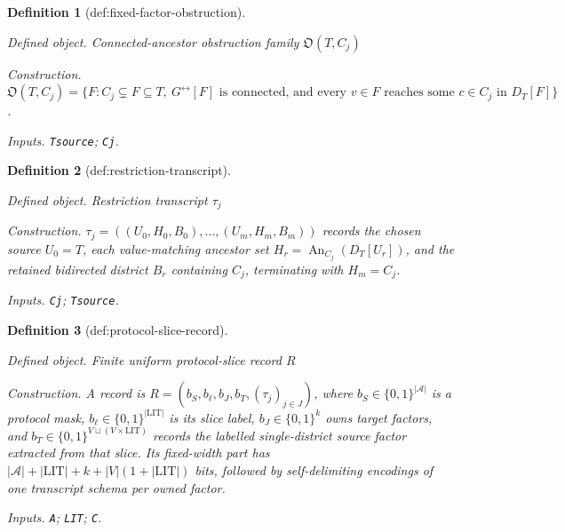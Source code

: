 \documentclass{article}
\newtheorem{definition}{Definition}
\begin{document}
\begin{definition}[def:fixed-factor-obstruction]\label{def:fixed-factor-obstruction}
\par\smallskip\noindent\emph{Defined object.} Connected-ancestor obstruction family \(\mathfrak O(T,C_j)\)
\par\smallskip\noindent\emph{Construction.} \(\mathfrak O(T,C_j)=\{F: C_j\subsetneq F\subseteq T,\ G^{\leftrightarrow}[F]\text{ is connected, and every }v\in F\text{ reaches some }c\in C_j\text{ in }D_T[F]\}\).
\par\smallskip\noindent\emph{Inputs.} \texttt{Tsource}; \texttt{Cj}.
\end{definition}

\begin{definition}[def:restriction-transcript]\label{def:restriction-transcript}
\par\smallskip\noindent\emph{Defined object.} Restriction transcript \(\tau_j\)
\par\smallskip\noindent\emph{Construction.} \(\tau_j=((U_0,H_0,B_0),\ldots,(U_m,H_m,B_m))\) records the chosen source \(U_0=T\), each value-matching ancestor set \(H_r=\operatorname{An}_{C_j}(D_T[U_r])\), and the retained bidirected district \(B_r\) containing \(C_j\), terminating with \(H_m=C_j\).
\par\smallskip\noindent\emph{Inputs.} \texttt{Cj}; \texttt{Tsource}.
\end{definition}

\begin{definition}[def:protocol-slice-record]\label{def:protocol-slice-record}
\par\smallskip\noindent\emph{Defined object.} Finite uniform protocol-slice record \(R\)
\par\smallskip\noindent\emph{Construction.} A record is \(R=(b_S,b_{\ell},b_J,b_T,(\tau_j)_{j\in J})\), where \(b_S\in\{0,1\}^{|\mathcal A|}\) is a protocol mask, \(b_{\ell}\in\{0,1\}^{|\mathrm{LIT}|}\) is its slice label, \(b_J\in\{0,1\}^{k}\) owns target factors, and \(b_T\in\{0,1\}^{V\sqcup(V\times\mathrm{LIT})}\) records the labelled single-district source factor extracted from that slice. Its fixed-width part has \(|\mathcal A|+|\mathrm{LIT}|+k+|V|(1+|\mathrm{LIT}|)\) bits, followed by self-delimiting encodings of one transcript schema per owned factor.
\par\smallskip\noindent\emph{Inputs.} \texttt{A}; \texttt{LIT}; \texttt{C}.
\end{definition}
\end{document}
